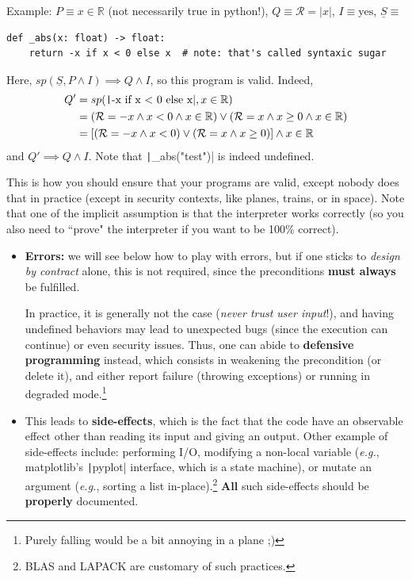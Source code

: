 \documentclass[10pt,
aspectratio=169
]{beamer}
\begin{document}
\begin{frame}[fragile]
	Example: $P \equiv x\in\mathbb{R}$ (not necessarily true in python!), $Q\equiv \mathcal{R} = |x|$, $I \equiv \text{yes}$, $\underline{S} \equiv$\begin{verbatim}
def _abs(x: float) -> float:
	return -x if x < 0 else x  # note: that's called syntaxic sugar
	\end{verbatim}
	Here, $sp(\underline{S}, P \land I) \implies Q \land I$, so this program is valid. Indeed, \begin{align*}
		Q' &= sp(\text{\texttt|-x if x < 0 else x|}, x\in\mathbb{R}) \\
		&= (\mathcal{R} = -x \land x < 0 \land x\in\mathbb{R}) \lor (\mathcal{R} = x \land x \geq 0 \land x\in\mathbb{R})\\
		&= [(\mathcal{R} = -x \land x < 0) \lor (\mathcal{R} = x \land x \geq 0)]  \land x\in\mathbb{R}
	\end{align*}
	and $Q' \implies Q \land I$. Note that \texttt|_abs("test")| is indeed undefined.
	
	This is how you should ensure that your programs are valid, except nobody does that in practice (except in security contexts, like planes, trains, or in space). Note that one of the implicit assumption is that the interpreter works correctly (so you also need to ``prove" the interpreter if you want to be 100\% correct).
\end{frame}

\begin{frame}
	\begin{itemize}
		\item \textbf{Errors:} we will see below how to play with errors, but if one sticks to \textit{design by contract} alone, this is not required, since the preconditions \textbf{must always} be fulfilled. 
		
		In practice, it is generally not the case (\textit{never trust user input}!), and having undefined behaviors may lead to unexpected bugs (since the execution can continue) or even security issues. Thus, one can abide to \textbf{defensive programming} instead, which consists in weakening the precondition (or delete it), and either report failure (throwing exceptions) or running in degraded mode.\footnote{Purely falling would be a bit annoying in a plane ;)}
		 \item This leads to \textbf{side-effects}, which is the fact that the code have an observable effect other than reading its input and giving an output. Other example of side-effects include: performing I/O, modifying a non-local variable (\textit{e.g.}, matplotlib's \texttt|pyplot| interface, which is a state machine), or mutate an argument (\textit{e.g.}, sorting a list in-place).\footnote{BLAS and LAPACK are customary of such practices.} \textbf{All} such side-effects should be \textbf{properly} documented.
	\end{itemize}
\end{frame}
\end{document}
